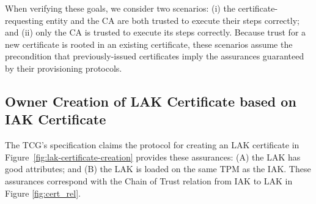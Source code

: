 \documentclass[runningheads]{llncs}
\begin{document}
When verifying these goals, we consider two scenarios: (i) the
certificate-requesting entity and the CA are both trusted to execute
their steps correctly; and (ii) only the CA is trusted to execute its
steps correctly.  Because trust for a new certificate is rooted in an
existing certificate, these scenarios assume the precondition that
previously-issued certificates imply the assurances guaranteed by
their provisioning protocols.

\subsection{Owner Creation of LAK Certificate based on IAK Certificate}

The TCG's specification claims the protocol for creating an LAK
certificate in Figure~\ref{fig:lak-certificate-creation} provides
these assurances: (A) the LAK has good attributes; and (B) the LAK is
loaded on the same TPM as the IAK. These assurances correspond with
the Chain of Trust relation from IAK to LAK in Figure \ref{fig:cert_rel}.
\end{document}
